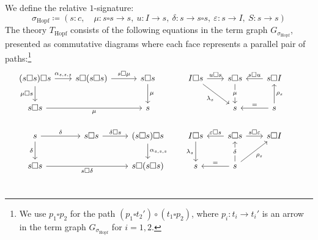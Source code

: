 \begin{examples}
\begin{enumerate}
    We define the relative $1$-signature:
    \[
    \sigma_{\text{Hopf}} \coloneqq (s\colon c, \quad \mu\colon s \square s \to s, \ u\colon I \to s, \ \delta\colon s \to s \square s, \ \varepsilon\colon s \to I, \ S\colon s \to s)
    \]
    The theory $T_{\text{Hopf}}$ consists of the following equations in the term graph $G_{\sigma_{\text{Hopf}}}$, presented as commutative diagrams where each face represents a parallel pair of paths:\footnote{We use $p_1\square p_2$ for the path $(p_1\square t_2')\circ (t_1\square p_2)$, where $p_i\colon t_i\to t_i'$ is an arrow in the term graph $G_{\sigma_{\mathrm{Hopf}}}$ for $i = 1,2$.}
    {\small \[
\begin{tikzcd}[column sep = 0.7 cm]
(s\square s)\square s \arrow[d, "\mu\square s"'] \arrow[r, "{\alpha_{s,s,s}}"] & s\square (s\square s) \arrow[r, "s\square \mu"]              & s\square s \arrow[d, "\mu"]                                         & I\square s \arrow[rd, "\lambda_s"'] \arrow[r, "u\square s"]              & s\square s \arrow[d, "\mu" description]                                         & s\square I \arrow[l, "s\square u"']    &                        \\
s\square s \arrow[rr, "\mu"']                                                  &                                                              & s                                                                   &                                                                          & s                                                                               & s \arrow[l, "="'] \arrow[u, "\rho_s"'] &                        \\
s \arrow[d, "\delta"'] \arrow[r, "\delta"]                                     & s\square s \arrow[r, "\delta\square s"]                      & (s\square s)\square s \arrow[d, "{\alpha_{s,s,s}}"]                 & I\square s \arrow[d, "\lambda_s"']                                       & s\square s \arrow[l, "\varepsilon\square s"'] \arrow[r, "s\square \varepsilon"] & s\square I                             &                        \\
s\square s \arrow[rr, "s\square \delta"']                                      &                                                              & s\square(s\square s)                                                & s                                                                        & s \arrow[l, "="'] \arrow[u, "\delta" description] \arrow[ru, "\rho_s"']         &                                        &                        \\

\end{tikzcd}\]}
\end{enumerate}
\end{examples}
